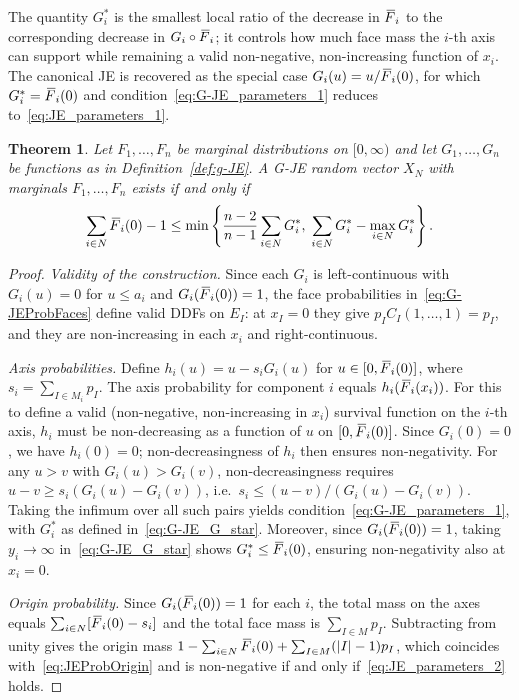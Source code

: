 \documentclass[letterpaper,12pt]{article}
\numberwithin{equation}{section}
\newtheorem{theorem}{Theorem}[section]
\newcommand{\N}{{N}}
\newcommand{\M}{{M}}
\newcommand{\I}{{I}}
\newcommand{\F}{\,\overline{\kern-0.175em F\kern-0em}}
\begin{document}
{The quantity $G_i^*$ is the smallest local ratio of the decrease in $\F_i$ to
the corresponding decrease in $G_i\circ\F_i$; it controls how much face mass
the $i$-th axis can support while remaining a valid non-negative, non-increasing
function of $x_i$. The canonical JE is recovered as the special case
$G_i(u)=u/\F_i(0)$, for which $G_i^*=\F_i(0)$ and condition~\eqref{eq:G-JE_parameters_1}
reduces to~\eqref{eq:JE_parameters_1}.

\begin{theorem}
\label{thm:G_JE_characterization}
Let $F_1,\dots,F_n$ be marginal distributions on $[0,\infty)$ and let
$G_1,\dots,G_n$ be functions as in Definition~\ref{def:g-JE}. A G-JE random
vector $X_{\N}$ with marginals $F_1,\dots,F_n$ exists if and only if
\begin{equation}
\label{eq:G-JECondition}
\sum_{i\in\N}\F_i(0)-1
\le \min\left\{\frac{n-2}{n-1}\sum_{i\in\N}G_i^*,\;
\sum_{i\in\N}G_i^*-\max_{i\in\N}G_i^*\right\}.
\end{equation}
\end{theorem}

\begin{proof}
\textit{Validity of the construction.}
Since each $G_i$ is left-continuous with $G_i(u)=0$ for $u\le a_i$ and
$G_i(\F_i(0))=1$, the face probabilities in~\eqref{eq:G-JEProbFaces} define
valid DDFs on $E_{\I}$: at $x_\I=0$ they give $p_\I C_\I(1,\dots,1)=p_\I$, and
they are non-increasing in each $x_i$ and right-continuous.

\textit{Axis probabilities.}
Define $h_i(u)=u-s_i G_i(u)$ for $u\in[0,\F_i(0)]$, where
$s_i=\sum_{\I\in\M_i}p_\I$. The axis probability for component $i$ equals
$h_i(\F_i(x_i))$. For this to define a valid (non-negative, non-increasing in
$x_i$) survival function on the $i$-th axis, $h_i$ must be non-decreasing as a
function of $u$ on $[0,\F_i(0)]$. Since $G_i(0)=0$, we have $h_i(0)=0$;
non-decreasingness of $h_i$ then ensures non-negativity. For any
$u>v$ with $G_i(u)>G_i(v)$, non-decreasingness requires
$u-v\ge s_i(G_i(u)-G_i(v))$, i.e.\ $s_i\le(u-v)/(G_i(u)-G_i(v))$. Taking the
infimum over all such pairs yields condition~\eqref{eq:G-JE_parameters_1}, with
$G_i^*$ as defined in~\eqref{eq:G-JE_G_star}. Moreover, since $G_i(\F_i(0))=1$,
taking $y_i\to\infty$ in~\eqref{eq:G-JE_G_star} shows $G_i^*\le\F_i(0)$,
ensuring non-negativity also at $x_i=0$.

\textit{Origin probability.}
Since $G_i(\F_i(0))=1$ for each $i$, the total mass on the axes equals
$\sum_{i\in\N}[\F_i(0)-s_i]$ and the total face mass is $\sum_{\I\in\M}p_\I$.
Subtracting from unity gives the origin mass $1-\sum_{i\in\N}\F_i(0)+\sum_{\I\in\M}(|\I|-1)p_\I$,
which coincides with~\eqref{eq:JEProbOrigin} and is non-negative if and only
if~\eqref{eq:JE_parameters_2} holds.


\end{proof}}
\end{document}
